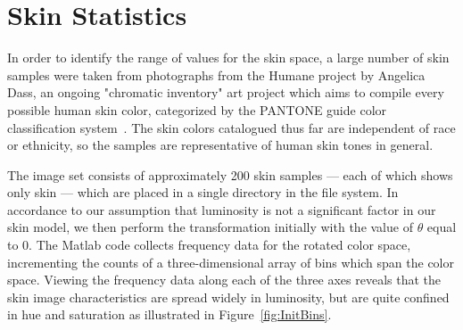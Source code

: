 \newcommand{\unitY}{\text{uY}}       %
\newcommand{\uY}{\unitY}             %
\newcommand{\intY}{\text{iY}}        %
\newcommand{\iY}{\intY}              %
\newcommand{\yMax}{\text{yMax}}      %
\newcommand{\yMin}{\text{yMin}}      %
\newcommand{\yRange}{\text{yRange}}  %

\newcommand{\unitR}{\text{uR}}
\newcommand{\uR}{\unitR}
\newcommand{\intR}{\text{iR}}
\newcommand{\iR}{\intR}
\newcommand{\discreteR}{\widetilde{\uR}}
\newcommand{\dR}{\discreteR}
\newcommand{\delR}{\delta\uR}
\newcommand{\rRange}{\text{rRange}}  %

\chapter{Skin Statistics}\label{sec:ChapSkin}
\ifpdf
    \graphicspath{{Chapter2/Figs/Raster/}{Chapter2/Figs/PDF/}{Chapter2/Figs/}}
\else
    \graphicspath{{Chapter2/Figs/Vector/}{Chapter2/Figs/}}
\fi

In order to identify the range of values for the skin space, a large number of skin samples were taken from photographs from the Humane project by Angelica Dass, an ongoing "chromatic inventory" art project which aims to compile every possible human skin color, categorized by the PANTONE guide color classification system~\cite{Dass2012}. The skin colors catalogued thus far are independent of race or ethnicity, so the samples are representative of human skin tones in general.

The image set consists of approximately 200 skin samples --- each of which shows only skin --- which are placed in a single directory in the file system. In accordance to our assumption that luminosity is not a significant factor in our skin model, we then perform the transformation initially with the value of $\theta$ equal to 0. The Matlab code collects frequency data for the rotated color space, incrementing the counts of a three-dimensional array of bins which span the color space. Viewing the frequency data along each of the three axes reveals that the skin image characteristics are spread widely in luminosity, but are quite confined in hue and saturation as illustrated in Figure~\ref{fig:InitBins}.


